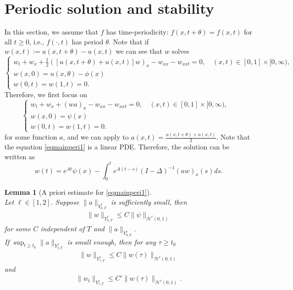 \documentclass[10pt,a4paper,final]{article}
\numberwithin{equation}{section}
\newtheorem{lemma}[theorem]{Lemma}
\newcommand{\cH}{\mathcal{H}}
\newcommand{\Gth}{\theta}
\begin{document}
\section{Periodic solution and stability}
In this section, we assume that $f$ has time-periodicity: $f(x,t+\theta)=f(x,t)$ for all $t\geq 0$, i.e., $f(\cdot,t)$ has period $\theta$. Note that if $w(x,t):=u(x,t+\Gth) -u(x,t)$ we can see that $w$ solves 
\begin{equation}\label{eqmainperi}
\begin{cases}
    w_t+w_x+\frac{1}{2}([u(x,t+\Gth)+u(x,t)]w)_x-w_{xx}-w_{xxt}=0,  \quad (x, t)\in [0,1]\times [0, \infty),&\\
    w(x,0)=u(x,\theta)-\phi(x) &\\
    w(0,t)=w(1,t)=0.&
    \end{cases}
\end{equation}
Therefore, we first focus on 
\begin{equation}\label{eqmainperi1}
\begin{cases}
    w_t+w_x+(wa)_x-w_{xx}-w_{xxt}=0,  \quad (x, t)\in [0,1]\times [0, \infty),&\\
    w(x,0)=\psi(x)&\\
    w(0,t)=w(1,t)=0.&
    \end{cases}
\end{equation}
for some function $a$, and we can apply to $a(x,t)=\frac{u(x,t+\Gth)+u(x,t)}{2}$. Note that the equation \eqref{eqmainperi1} is a linear PDE. Therefore, the solution can be written as 
$$w(t)=e^{At}\psi(x)-\int_0^te^{A(t-s)}(I-\Delta)^{-1}(aw)_x(s)ds.$$

\begin{lemma}[A priori estimate for \eqref{eqmainperi1}]\label{aprieqap1}\ \\
Let $\ell\in [1,2]$. Suppose $\|a\|_{Y^{\ell}_{0,T}}$ is sufficiently small, then 
    \begin{align}\label{w_l1}
        \|w\|_{Y^{\ell}_{0,T}}\leq C\|\psi\|_{\cH^{\ell}(0,1)}
    \end{align}
    for some $C$ independent of $T$ and $\|a\|_{Y^{\ell}_{0,T}}$.\\

    If $\sup_{t\geq t_0}\|a\|_{Y^{\ell}_{t,T}}$ is small enough, then for any $\tau\geq t_0$
   \begin{align} \label{WYtauTtoWtau}
       \|w\|_{Y^{\ell}_{\tau,T}}\leq C\|w(\tau)\|_{\cH^{\ell}(0,1)}
   \end{align}
   and
      \begin{align} \label{WtYtauTtoWtau}
       \|w_t\|_{Y^{\ell}_{\tau,T}}\leq C'\|w(\tau)\|_{\cH^{\ell}(0,1)}.
   \end{align}
\end{lemma}
\end{document}
